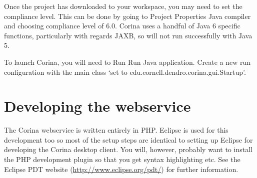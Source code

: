 Once the project has downloaded to your workspace, you may need to set the compliance level.  This can be done by going to Project \MVRightarrow Properties \MVRightarrow Java compiler and choosing compliance level of 6.0.  Corina uses a handful of Java 6 specific functions, particularly with regards JAXB, so will not run successfully with Java 5.

To launch Corina, you will need to Run \MVRightarrow Run \MVRightarrow Java application.  Create a new run configuration with the main class `set to edu.cornell.dendro.corina.gui.Startup'.     


\section{Developing the webservice}

The Corina webservice is written entirely in PHP.  Eclipse is used for this development too so most of the setup steps are identical to setting up Eclipse for developing the Corina desktop client.  You will, however, probably want to install the PHP development plugin so that you get syntax highlighting etc.  See the Eclipse PDT website (\url{http://www.eclipse.org/pdt/}) for further information.

  